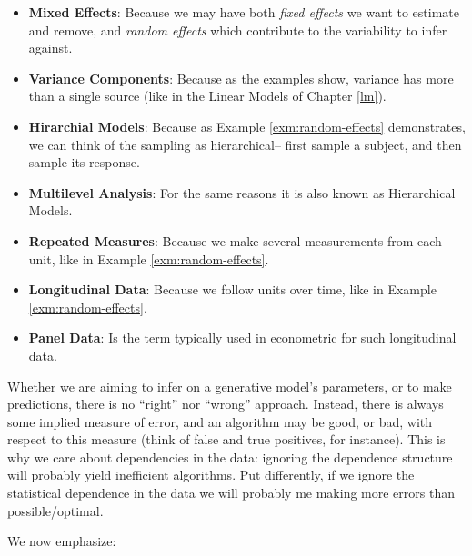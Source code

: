 \documentclass[]{book}
\theoremstyle{definition}
\theoremstyle{definition}
\theoremstyle{definition}
\theoremstyle{remark}
\begin{document}
\begin{itemize}
\item
  \textbf{Mixed Effects}:
  Because we may have both \emph{fixed effects} we want to estimate and remove, and \emph{random effects} which contribute to the variability to infer against.
\item
  \textbf{Variance Components}:
  Because as the examples show, variance has more than a single source (like in the Linear Models of Chapter \ref{lm}).
\item
  \textbf{Hirarchial Models}:
  Because as Example \ref{exm:random-effects} demonstrates, we can think of the sampling as hierarchical-- first sample a subject, and then sample its response.
\item
  \textbf{Multilevel Analysis}:
  For the same reasons it is also known as Hierarchical Models.
\item
  \textbf{Repeated Measures}:
  Because we make several measurements from each unit, like in Example \ref{exm:random-effects}.
\item
  \textbf{Longitudinal Data}:
  Because we follow units over time, like in Example \ref{exm:random-effects}.
\item
  \textbf{Panel Data}:
  Is the term typically used in econometric for such longitudinal data.
\end{itemize}

Whether we are aiming to infer on a generative model's parameters, or to make predictions, there is no ``right'' nor ``wrong'' approach. Instead, there is always some implied measure of error, and an algorithm may be good, or bad, with respect to this measure (think of false and true positives, for instance).
This is why we care about dependencies in the data: ignoring the dependence structure will probably yield inefficient algorithms.
Put differently, if we ignore the statistical dependence in the data we will probably me making more errors than possible/optimal.

We now emphasize:
\end{document}
